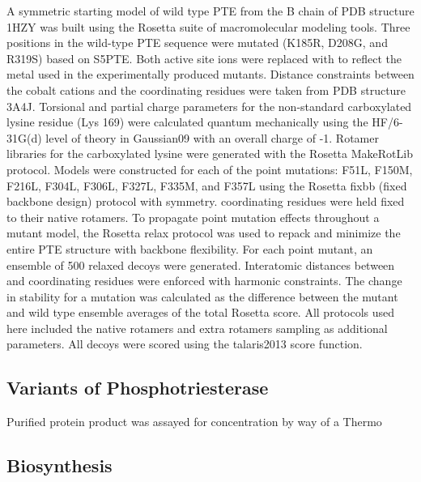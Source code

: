 \begin{refsection}
A symmetric starting model of wild type PTE from the B chain of PDB structure
1HZY\cite{Benning2001a} was built using the Rosetta suite of macromolecular
modeling tools\cite{Leaver-Fay2011}. Three positions in the
wild-type PTE sequence were mutated (K185R, D208G, and R319S) based on
S5PTE\cite{Roodveldt2005}. Both active site  ions were replaced
with  to reflect the metal used in the experimentally produced
mutants.  Distance constraints between the cobalt cations and the coordinating
residues were taken from PDB structure 3A4J\cite{Jackson2009b}.  Torsional and
partial charge parameters for the non-standard carboxylated lysine residue (Lys
169) were calculated quantum mechanically using the HF/6-31G(d) level of theory
in Gaussian09\cite{Frisch2009} with an overall charge of -1.  Rotamer libraries
for the carboxylated lysine were generated with the Rosetta
MakeRotLib\cite{Renfrew2012b} protocol.  Models were constructed for each of
the point mutations: F51L, F150M, F216L, F304L, F306L, F327L, F335M, and F357L
using the Rosetta fixbb (fixed backbone design) protocol with
symmetry\cite{DiMaio2011a}.   coordinating residues were held fixed
to their native rotamers. To propagate point mutation effects throughout a
mutant model, the Rosetta relax protocol was used to repack and minimize the
entire PTE structure with backbone flexibility. For each point mutant, an
ensemble of 500 relaxed decoys were generated. Interatomic distances between
 and coordinating residues were enforced with harmonic constraints.
The change in stability for a mutation was calculated as the difference between
the mutant and wild type ensemble averages of the total Rosetta score. All
protocols used here included the native rotamers and extra rotamers sampling as
additional parameters. All decoys were scored using the talaris2013 score
function\cite{Leaver-Fay2013a}.

\subsection{Variants of Phosphotriesterase}

Purified protein product was assayed for concentration by way of a Thermo

\subsection{Biosynthesis}


\end{refsection}

